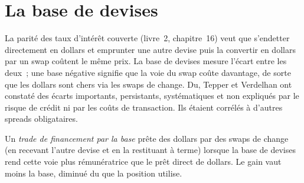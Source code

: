 \begin{omfigure}

\label{fig:s2:cross-currency-basis-and-fx-carry:hedge}
\end{omfigure}

\section{La base de devises}

La parité des taux d'intérêt couverte (livre~2, chapitre~16) veut que s'endetter directement en dollars et emprunter une autre devise puis la convertir en dollars par un swap coûtent
le même prix. La base de devises mesure l'écart entre les deux~; une base négative signifie que la voie du swap coûte davantage, de sorte que les dollars sont chers
via les swaps de change. Du, Tepper et Verdelhan ont constaté des écarts importants, persistants, systématiques et non expliqués par le risque de crédit ni par les coûts de transaction. Ils
étaient corrélés à d'autres spreads obligataires.

\begin{definition}\label{def:s2:cross-currency-basis-and-fx-carry:funding}
Un \emph{trade de financement par la base} prête des dollars par des swaps de change (en recevant l'autre devise et en la restituant à terme) lorsque
la base de devises rend cette voie plus rémunératrice que le prêt direct de dollars. Le gain vaut moins la base, diminué du  que
la position utilise.
\end{definition}

